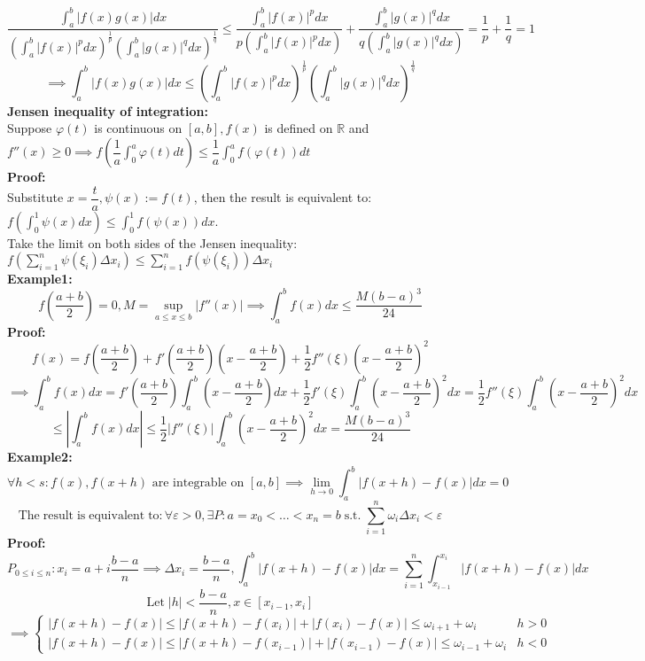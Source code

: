 \documentclass{article}
\newcommand{\R}{\mathbb{R}}
\newcommand{\0}{{\bf{0}}}
\begin{document}
$$\frac{\displaystyle\int_a^b|f(x)g(x)|dx}{\left(\displaystyle\int_a^b|f(x)|^pdx\right)^\frac{1}{p}\left(\displaystyle\int_a^b|g(x)|^qdx\right)^\frac{1}{q}}\le\frac{\displaystyle\int_a^b|f(x)|^pdx}{p\left(\displaystyle\int_a^b|f(x)|^pdx\right)}+\frac{\displaystyle\int_a^b|g(x)|^qdx}{q\left(\displaystyle\int_a^b|g(x)|^qdx\right)}=\frac{1}{p}+\frac{1}{q}=1$$
$$\implies\int_a^b|f(x)g(x)|dx\le\left(\int_a^b|f(x)|^pdx\right)^{\frac{1}{p}}\left(\int_a^b|g(x)|^{q}dx\right)^\frac{1}{q}$$
\textbf{Jensen inequality of integration:}\\
Suppose $\varphi(t)$ is continuous on $[a,b],f(x)$ is defined on $\R$ and $f''(x)\geq0\implies f\left(\dfrac{1}{a}\displaystyle\int_0^a\varphi(t)dt\right)\le\dfrac{1}{a}\displaystyle\int_0^af(\varphi(t))dt$\\
\textbf{Proof:}\\
Substitute $x=\dfrac{t}{a},\psi(x):=f(t)$, then the result is equivalent to: $f\left(\displaystyle\int_0^1\psi(x)dx\right)\le\displaystyle\int_0^1f(\psi(x))dx$.\\
Take the limit on both sides of the Jensen inequality: $f\left(\sum\limits_{i=1}^n\psi(\xi_i)\Delta x_i\right)\le\sum\limits_{i=1}^nf(\psi(\xi_i))\Delta x_i$\\
\textbf{Example1:}
$$f\left(\frac{a+b}{2}\right)=0,M=\sup_{a\le x\le b}|f''(x)|\implies \int_{a}^{b}f(x)dx\le \frac{M(b-a)^3}{24}$$
\textbf{Proof:}
$$f(x)=f\left(\frac{a+b}{2}\right)+f'\left(\frac{a+b}{2}\right)\left(x-\frac{a+b}{2}\right)+\frac{1}{2}f''(\xi)\left(x-\frac{a+b}{2}\right)^2$$
$$\implies\int_a^bf(x)dx=f'\left(\frac{a+b}{2}\right)\int_a^b\left(x-\frac{a+b}{2}\right)dx+\frac{1}{2}f'(\xi)\int_a^b\left(x-\frac{a+b}{2}\right)^2dx=\frac{1}{2}f''(\xi)\int_a^b\left(x-\frac{a+b}{2}\right)^2dx$$
$$\le\left|\int_a^bf(x)dx\right|\le\frac{1}{2}|f''(\xi)|\int_a^b\left(x-\frac{a+b}{2}\right)^2dx=\frac{M(b-a)^3}{24}$$
\textbf{Example2:}
$$\forall h<s:f(x),f(x+h)\mbox{ are
integrable on }[a,b]\implies\lim_{h\to 0}\int_a^b|f(x+h)-f(x)|dx=0$$
$$\text{The}\;\text{result}\;\text{is}\;\text{equivalent}\;\text{to}:\forall \varepsilon>0,\exists P:a=x_{0}<\dots<x_{n}=b\;\text{s.t.}\;\sum_{i=1}^{n}\omega_{i}\Delta x_{i}<\varepsilon$$
\textbf{Proof:}
$$P_{0\leq i\leq n}:x_{i}=a+i\frac{b-a}{n}\implies\Delta x_{i}=\frac{b-a}{n},\int_{a}^{b}\left|f\left(x+h\right)-f\left(x\right)\right|dx=\sum_{i=1}^{n}\int_{x_{i-1}}^{x_{i}}\left|f\left(x+h\right)-f\left(x\right)\right|dx$$
$$\mbox{Let}\;\left|h\right|<\frac{b-a}{n},x\in\left[x_{i-1},x_{i}\right]$$ $$\implies\begin{cases}
    {\left|f\left(x+h\right)-f\left(x\right)\right|\leq\left|f\left(x+h\right)-f\left(x_{i}\right)\right|+\left|f\left(x_{i}\right)-f\left(x\right)\right|\leq \omega_{i+1}+\omega_{i}}&{h>0}\\
    {\left|f\left(x+h\right)-f\left(x\right)\right|\leq\left|f\left(x+h\right)-f\left(x_{i-1}\right)\right|+\left|f\left(x_{i-1}\right)-f\left(x\right)\right|\leq \omega_{i-1}+\omega_{i}}&{h<0}
\end{cases}$$
\end{document}
